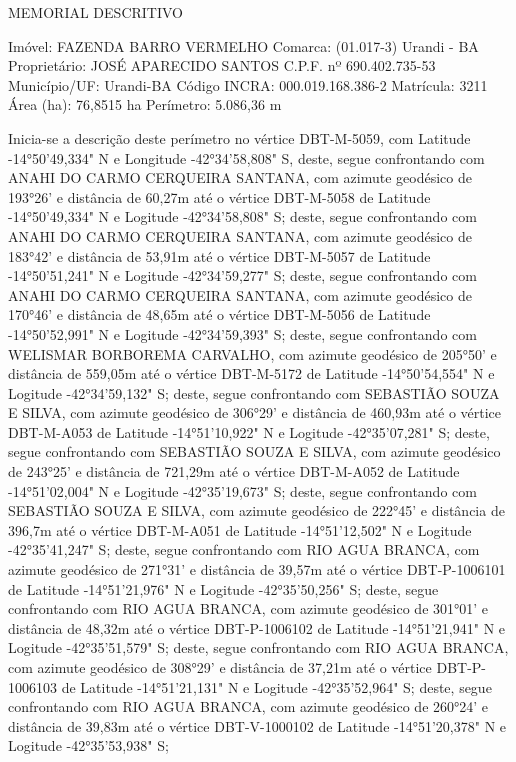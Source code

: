  MEMORIAL DESCRITIVO

Imóvel: FAZENDA BARRO VERMELHO							Comarca: (01.017-3) Urandi - BA
Proprietário: JOSÉ APARECIDO SANTOS C.P.F. nº 690.402.735-53
Município/UF: Urandi-BA
Código INCRA: 000.019.168.386-2					Matrícula: 3211
Área (ha): 76,8515 ha					Perímetro: 5.086,36 m

Inicia-se a descrição deste perímetro no vértice DBT-M-5059, 
com Latitude -14°50'49,334" N e Longitude -42°34'58,808" S, deste, segue confrontando com ANAHI DO CARMO CERQUEIRA SANTANA, com azimute geodésico de 193°26' e distância de 
60,27m até o vértice DBT-M-5058 de Latitude -14°50'49,334" N e Logitude -42°34'58,808" S;
deste, segue confrontando com ANAHI DO CARMO CERQUEIRA SANTANA, com azimute geodésico de 183°42' e distância de 
53,91m até o vértice DBT-M-5057 de Latitude -14°50'51,241" N e Logitude -42°34'59,277" S;
deste, segue confrontando com ANAHI DO CARMO CERQUEIRA SANTANA, com azimute geodésico de 170°46' e distância de 
48,65m até o vértice DBT-M-5056 de Latitude -14°50'52,991" N e Logitude -42°34'59,393" S;
deste, segue confrontando com WELISMAR BORBOREMA CARVALHO, com azimute geodésico de 205°50' e distância de 
559,05m até o vértice DBT-M-5172 de Latitude -14°50'54,554" N e Logitude -42°34'59,132" S;
deste, segue confrontando com SEBASTIÃO SOUZA E SILVA, com azimute geodésico de 306°29' e distância de 
460,93m até o vértice DBT-M-A053 de Latitude -14°51'10,922" N e Logitude -42°35'07,281" S;
deste, segue confrontando com SEBASTIÃO SOUZA E SILVA, com azimute geodésico de 243°25' e distância de 
721,29m até o vértice DBT-M-A052 de Latitude -14°51'02,004" N e Logitude -42°35'19,673" S;
deste, segue confrontando com SEBASTIÃO SOUZA E SILVA, com azimute geodésico de 222°45' e distância de 
396,7m até o vértice DBT-M-A051 de Latitude -14°51'12,502" N e Logitude -42°35'41,247" S;
deste, segue confrontando com RIO AGUA BRANCA, com azimute geodésico de 271°31' e distância de 
39,57m até o vértice DBT-P-1006101 de Latitude -14°51'21,976" N e Logitude -42°35'50,256" S;
deste, segue confrontando com RIO AGUA BRANCA, com azimute geodésico de 301°01' e distância de 
48,32m até o vértice DBT-P-1006102 de Latitude -14°51'21,941" N e Logitude -42°35'51,579" S;
deste, segue confrontando com RIO AGUA BRANCA, com azimute geodésico de 308°29' e distância de 
37,21m até o vértice DBT-P-1006103 de Latitude -14°51'21,131" N e Logitude -42°35'52,964" S;
deste, segue confrontando com RIO AGUA BRANCA, com azimute geodésico de 260°24' e distância de 
39,83m até o vértice DBT-V-1000102 de Latitude -14°51'20,378" N e Logitude -42°35'53,938" S;
